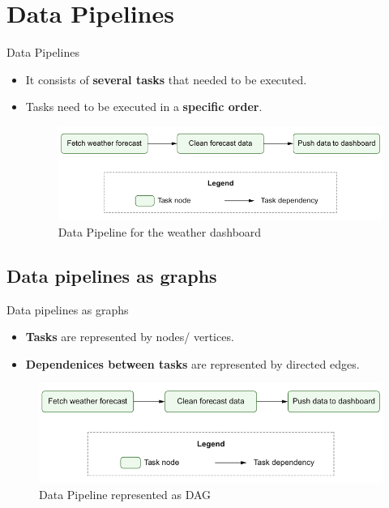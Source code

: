 \documentclass[14pt, aspectratio=169]{beamer}
\begin{document}
	\section{Data Pipelines}
	\begin{frame}{Data Pipelines}
		\begin{itemize}
			\item It consists of \textbf{several tasks} that needed to be executed.
			\item Tasks need to be executed in a \textbf{specific order}.
			\hspace{2cm}
			\begin{figure}[H]
				\centering
				\includegraphics[width=13cm]{data-pipelines.png}
				\caption{Data Pipeline for the weather dashboard}
			\end{figure}
		\end{itemize}
	\end{frame}
	
	\subsection{Data pipelines as graphs}
	\begin{frame}{Data pipelines as graphs}
		\begin{itemize}
			\item \textbf{Tasks} are represented by  nodes/ vertices.
			\item \textbf{Dependenices between tasks} are represented by directed edges.
		\end{itemize}
		\begin{figure}[H]
			\centering
			\includegraphics[width=13cm]{data-pipelines.png}
			\caption{Data Pipeline represented as DAG}
		\end{figure}
	\end{frame}
\end{document}
